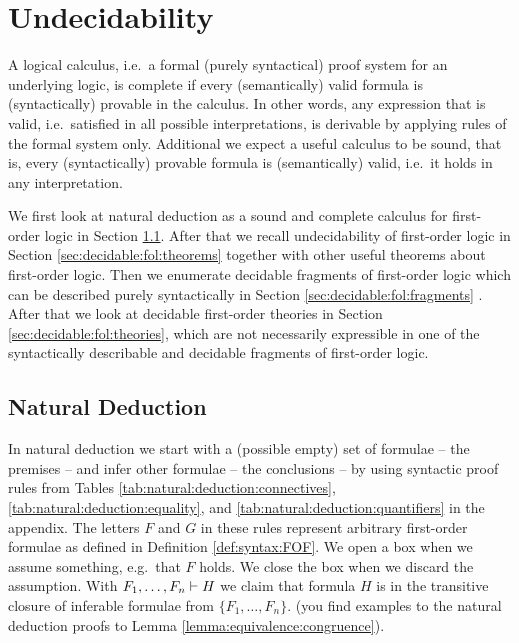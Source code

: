

\chapter{Undecidability}

A logical calculus, i.e.~a formal (purely syntactical) proof system for an underlying logic, 
is {\myem complete} if every (semantically) valid formula is (syntactically) provable in the calculus.
In other words, any expression that is valid, i.e.~satisfied in all possible interpretations, 
is derivable by applying rules of the formal system only.
Additional we expect a useful calculus to be {\myem sound}, that is, 
every (syntactically) provable formula is (semantically) valid, 
i.e.~it holds in any interpretation.



We first look at natural deduction as a sound and complete calculus 
for first-order logic in Section \ref{sec:natural:deduction}.
After that we recall undecidability of first-order logic in Section \ref{sec:decidable:fol:theorems} 
together with other useful theorems about first-order logic.
Then we enumerate decidable fragments of first-order logic
which can be described purely syntactically in Section \ref{sec:decidable:fol:fragments} .
After that we look at decidable first-order theories in Section \ref{sec:decidable:fol:theories}, 
which are not necessarily expressible 
in one of the syntactically describable and decidable fragments of first-order logic.

\section{\gls{Natural Deduction}}
\label{sec:natural:deduction}

In natural deduction \cite{Huth:2004:LCS:975331}
we start with a (possible empty) set of formulae -- the premises -- 
and infer other formulae -- the conclusions -- by using syntactic proof rules from Tables 
\ref{tab:natural:deduction:connectives}, 
\ref{tab:natural:deduction:equality}, 
and \ref{tab:natural:deduction:quantifiers} in the appendix.
The letters $F$ and $G$ in these rules represent arbitrary first-order formulae 
as defined in Definition \vref{def:syntax:FOF}. 
We open a box when we assume something, e.g.~that $F$ holds. 
We close the box when we discard the assumption. 
With $F_1,\ldots,F_n \vdash H$ we claim that formula $H$ 
is in the transitive closure of inferable formulae from $\{ F_1,\ldots,F_n\}$.
(you find examples to the natural deduction proofs to Lemma \vref{lemma:equivalence:congruence}).


